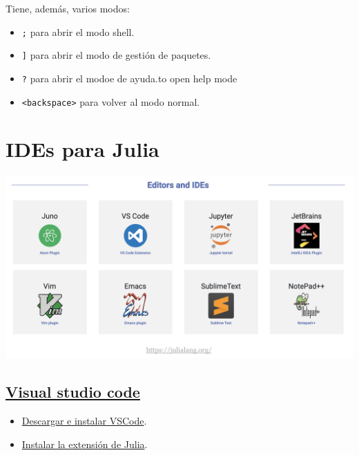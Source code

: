 \documentclass[
  letterpaper,
  DIV=11,
  numbers=noendperiod]{scrreprt}
\providecommand{\tightlist}{%
  \setlength{\itemsep}{0pt}\setlength{\parskip}{0pt}}\usepackage{longtable,booktabs,array}
\begin{document}
Tiene, además, varios modos:

\begin{itemize}
\tightlist
\item
  \texttt{;} para abrir el modo shell.
\item
  \texttt{{]}} para abrir el modo de gestión de paquetes.
\item
  \texttt{?} para abrir el modoe de ayuda.to open help mode
\item
  \texttt{\textless{}backspace\textgreater{}} para volver al modo
  normal.
\end{itemize}

\hypertarget{ides-para-julia}{%
\section{IDEs para Julia}\label{ides-para-julia}}

\includegraphics{./img/julia-ides.png}

\hypertarget{visual-studio-code}{%
\subsection{\texorpdfstring{\href{https://code.visualstudio.com/}{Visual
studio code}}{Visual studio code}}\label{visual-studio-code}}

\begin{itemize}
\tightlist
\item
  \href{https://code.visualstudio.com/Download}{Descargar e instalar
  VSCode}.
\item
  \href{https://www.julia-vscode.org/}{Instalar la extensión de Julia}.
\end{itemize}
\end{document}
